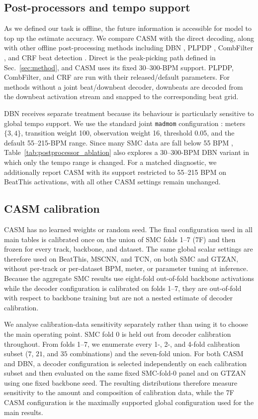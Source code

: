 \documentclass{article}
\begin{document}
\subsection{Post-processors and tempo support}
As we defined our task is offline, the future information is accessible for model to top up the estimate accuracy. We compare CASM with the direct decoding, along with other offline post-processing methods including DBN \cite{krebs2015dbn}, PLPDP \cite{chiu2023localperiodicity}, CombFilter \cite{bock2015combfilter}, and CRF beat detection \cite{korzeniowski2014crf}. Direct is the peak-picking path defined in Sec.~\ref{sec:method}, and CASM uses its fixed 30--300-BPM support. PLPDP, CombFilter, and CRF are run with their released/default parameters. For methods without a joint beat/downbeat decoder, downbeats are decoded from the downbeat activation stream and snapped to the corresponding beat grid.

DBN receives separate treatment because its behaviour is particularly sensitive to global tempo support. We use the standard joint \texttt{madmom} configuration \cite{krebs2015dbn}: meters $\{3,4\}$, transition weight 100, observation weight 16, threshold 0.05, and the default 55--215-BPM range. Since many SMC data are fall below 55 BPM \cite{ahn2026smcblindspot}, Table~\ref{tab:postprocessor_ablation} also explores a 30--300-BPM DBN variant in which only the tempo range is changed. For a matched diagnostic, we additionally report CASM with its support restricted to 55--215 BPM on BeatThis activations, with all other CASM settings remain unchanged.

\subsection{CASM calibration}
CASM has no learned weights or random seed. The final configuration used in all main tables is calibrated once on the union of SMC folds 1--7 (7F) and then frozen for every track, backbone, and dataset. The same global scalar settings are therefore used on BeatThis, MSCNN, and TCN, on both SMC and GTZAN, without per-track or per-dataset BPM, meter, or parameter tuning at inference. Because the aggregate SMC results use eight-fold out-of-fold backbone activations while the decoder configuration is calibrated on folds 1--7, they are out-of-fold with respect to backbone training but are not a nested estimate of decoder calibration.

We analyse calibration-data sensitivity separately rather than using it to choose the main operating point. SMC fold 0 is held out from decoder calibration throughout. From folds 1--7, we enumerate every 1-, 2-, and 4-fold calibration subset ($7$, $21$, and $35$ combinations) and the seven-fold union. For both CASM and DBN, a decoder configuration is selected independently on each calibration subset and then evaluated on the same fixed SMC-fold-0 panel and on GTZAN using one fixed backbone seed. The resulting distributions therefore measure sensitivity to the amount and composition of calibration data, while the 7F CASM configuration is the maximally supported global configuration used for the main results.
\end{document}
